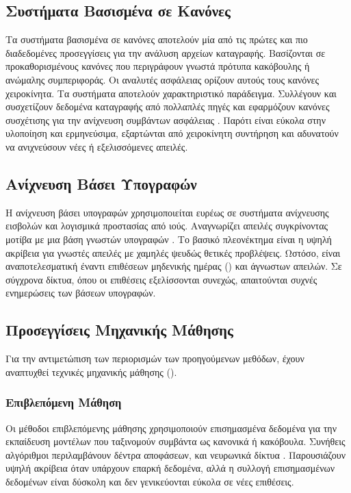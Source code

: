 \subsection{Συστήματα Βασισμένα σε Κανόνες}

Τα συστήματα βασισμένα σε κανόνες αποτελούν μία από τις πρώτες και πιο διαδεδομένες προσεγγίσεις για την ανάλυση αρχείων καταγραφής. Βασίζονται σε προκαθορισμένους κανόνες που περιγράφουν γνωστά πρότυπα κακόβουλης ή ανώμαλης συμπεριφοράς. Οι αναλυτές ασφάλειας ορίζουν αυτούς τους κανόνες χειροκίνητα. Τα συστήματα  αποτελούν χαρακτηριστικό παράδειγμα. Συλλέγουν και συσχετίζουν δεδομένα καταγραφής από πολλαπλές πηγές και εφαρμόζουν κανόνες συσχέτισης για την ανίχνευση συμβάντων ασφάλειας \cite{behl2017cybersecurity}. Παρότι είναι εύκολα στην υλοποίηση και ερμηνεύσιμα, εξαρτώνται από χειροκίνητη συντήρηση και αδυνατούν να ανιχνεύσουν νέες ή εξελισσόμενες απειλές.

\subsection{Ανίχνευση Βάσει Υπογραφών}

Η ανίχνευση βάσει υπογραφών χρησιμοποιείται ευρέως σε συστήματα ανίχνευσης εισβολών και λογισμικά προστασίας από ιούς. Αναγνωρίζει απειλές συγκρίνοντας μοτίβα με μια βάση γνωστών υπογραφών \cite{garcia2009anomaly}. Το βασικό πλεονέκτημα είναι η υψηλή ακρίβεια για γνωστές απειλές με χαμηλές ψευδώς θετικές προβλέψεις. Ωστόσο, είναι αναποτελεσματική έναντι επιθέσεων μηδενικής ημέρας () και άγνωστων απειλών. Σε σύγχρονα δίκτυα, όπου οι επιθέσεις εξελίσσονται συνεχώς, απαιτούνται συχνές ενημερώσεις των βάσεων υπογραφών.

\subsection{Προσεγγίσεις Μηχανικής Μάθησης}

Για την αντιμετώπιση των περιορισμών των προηγούμενων μεθόδων, έχουν αναπτυχθεί τεχνικές μηχανικής μάθησης ().

\subsubsection{Επιβλεπόμενη Μάθηση}

Οι μέθοδοι επιβλεπόμενης μάθησης χρησιμοποιούν επισημασμένα δεδομένα για την εκπαίδευση μοντέλων που ταξινομούν συμβάντα ως κανονικά ή κακόβουλα. Συνήθεις αλγόριθμοι περιλαμβάνουν δέντρα αποφάσεων,  και νευρωνικά δίκτυα \cite{nguyen2018deep}. Παρουσιάζουν υψηλή ακρίβεια όταν υπάρχουν επαρκή δεδομένα, αλλά η συλλογή επισημασμένων δεδομένων είναι δύσκολη και δεν γενικεύονται εύκολα σε νέες επιθέσεις.

